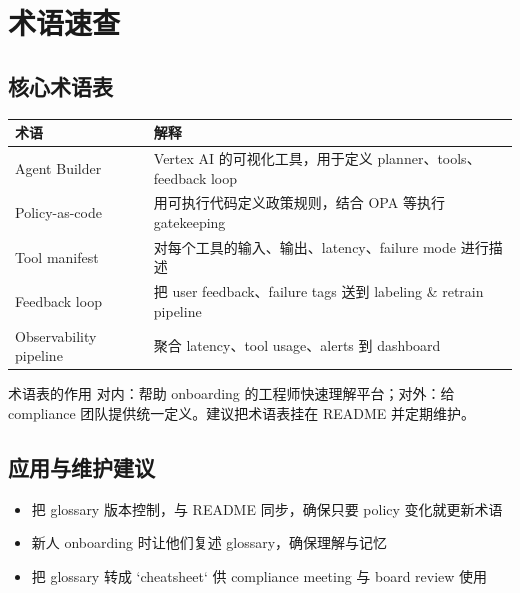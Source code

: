 \section{术语速查}

\subsection{核心术语表}

\begin{tabular}{p{} p{}}
\toprule
术语 & 解释 \\
\midrule
Agent Builder & Vertex AI 的可视化工具，用于定义 planner、tools、feedback loop \\
Policy-as-code & 用可执行代码定义政策规则，结合 OPA 等执行 gatekeeping \\
Tool manifest & 对每个工具的输入、输出、latency、failure mode 进行描述 \\
Feedback loop & 把 user feedback、failure tags 送到 labeling \& retrain pipeline \\
Observability pipeline & 聚合 latency、tool usage、alerts 到 dashboard \\
\bottomrule
\end{tabular}

\begin{importantbox}{术语表的作用}
对内：帮助 onboarding 的工程师快速理解平台；对外：给 compliance 团队提供统一定义。建议把术语表挂在 README 并定期维护。
\end{importantbox}

\subsection{应用与维护建议}

\begin{itemize}
    \item 把 glossary 版本控制，与 README 同步，确保只要 policy 变化就更新术语
    \item 新人 onboarding 时让他们复述 glossary，确保理解与记忆
    \item 把 glossary 转成 `cheatsheet` 供 compliance meeting 与 board review 使用
\end{itemize}

